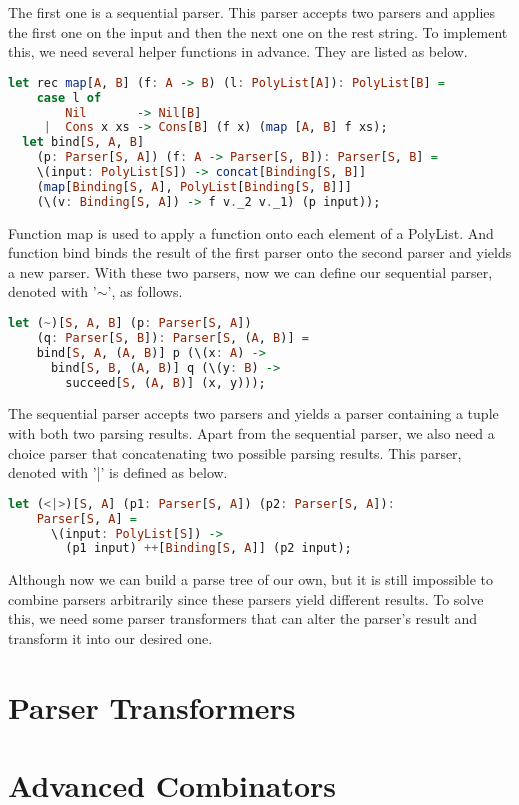 The first one is a sequential parser. This parser accepts two parsers and applies the first one on the input and then the next one on the rest string. To implement this, we need several helper functions in advance. They are listed as below.
\begin{singlespace}
\begin{lstlisting}[language=Haskell,basicstyle=\small]
  let rec map[A, B] (f: A -> B) (l: PolyList[A]): PolyList[B] =
    case l of
        Nil       -> Nil[B]
     |  Cons x xs -> Cons[B] (f x) (map [A, B] f xs);
  let bind[S, A, B] 
    (p: Parser[S, A]) (f: A -> Parser[S, B]): Parser[S, B] =
    \(input: PolyList[S]) -> concat[Binding[S, B]] 
    (map[Binding[S, A], PolyList[Binding[S, B]]] 
    (\(v: Binding[S, A]) -> f v._2 v._1) (p input));
\end{lstlisting}
\end{singlespace}
Function map is used to apply a function onto each element of a PolyList. And function bind binds the result of the first parser onto the second parser and yields a new parser. With these two parsers, now we can define our sequential parser, denoted with '$\sim$', as follows.
\begin{singlespace}
\begin{lstlisting}[language=Haskell,basicstyle=\small]
  let (~)[S, A, B] (p: Parser[S, A]) 
    (q: Parser[S, B]): Parser[S, (A, B)] =
	bind[S, A, (A, B)] p (\(x: A) -> 
	  bind[S, B, (A, B)] q (\(y: B) -> 
	    succeed[S, (A, B)] (x, y)));
\end{lstlisting}
\end{singlespace}
The sequential parser accepts two parsers and yields a parser containing a tuple with both two parsing results. Apart from the sequential parser, we also need a choice parser that concatenating two possible parsing results. This parser, denoted with '|' is defined as below.
\begin{singlespace}
\begin{lstlisting}[language=Haskell,basicstyle=\small]
  let (<|>)[S, A] (p1: Parser[S, A]) (p2: Parser[S, A]): 
    Parser[S, A] =
	  \(input: PolyList[S]) -> 
	    (p1 input) ++[Binding[S, A]] (p2 input);
\end{lstlisting}
\end{singlespace}
Although now we can build a parse tree of our own, but it is still impossible to combine parsers arbitrarily since these parsers yield different results. To solve this, we need some parser transformers that can alter the parser's result and transform it into our desired one.

\section{Parser Transformers}

\section{Advanced Combinators}